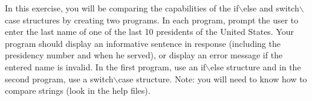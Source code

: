 {In this exercise, you will be comparing the capabilities of the if$\backslash$else and switch$\backslash$case structures by creating two programs.  In each program, prompt the user to enter the last name of one of the last 10 presidents of the United States.  Your program should display an informative sentence in response (including the presidency number and when he served), or display an error message if the entered name is invalid.  In the first program, use an if$\backslash$else structure and in the second program, use a switch$\backslash$case structure. Note: you will need to know how to compare strings (look in the help files). }
{}

